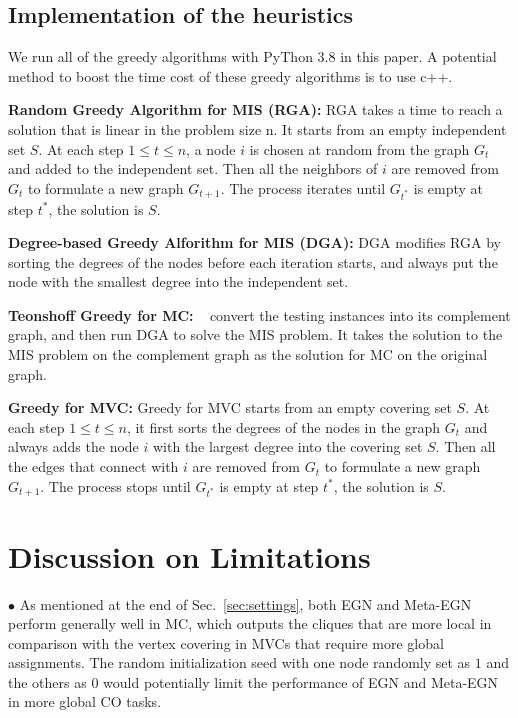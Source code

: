 \subsection{Implementation of the heuristics}
\label{sec:greedy_implementation}
We run all of the greedy algorithms with PyThon 3.8 in this paper. A potential method to boost the time cost of these greedy algorithms is to use c++.

\textbf{Random Greedy Algorithm for MIS (RGA):} RGA takes a time to reach a solution that is linear in the problem size n. It starts from an empty independent set $S$. At each step $1 \leq t \leq n$, a node $i$ is chosen at random from the graph $G_t$ and added to the independent set. Then all the neighbors of $i$ are removed from $G_t$ to formulate a new graph $G_{t+1}$. The process iterates until $G_{t^*}$ is empty at step $t^*$, the solution is $S$.

\textbf{Degree-based Greedy Alforithm for MIS (DGA):} DGA modifies RGA by sorting the degrees of the nodes before each iteration starts, and always put the node with the smallest degree into the independent set.

\textbf{Teonshoff Greedy for MC:} ~\cite{toenshoff2021graph} convert the testing instances into its complement graph, and then run DGA to solve the MIS problem. It takes the solution to the MIS problem on the complement graph as the solution for MC on the original graph.

\textbf{Greedy for MVC:} Greedy for MVC starts from an empty covering set $S$. At each step $1 \leq t \leq n$, it first sorts the degrees of the nodes in the graph $G_t$ and always adds the node $i$ with the largest degree into the covering set $S$. Then all the edges that connect with $i$ are removed from $G_t$ to formulate a new graph $G_{t+1}$. The process stops until $G_{t^*}$ is empty at step $t^*$, the solution is $S$.

\section{Discussion on Limitations}
$\bullet$ As mentioned at the end of Sec.~\ref{sec:settings}, both EGN and Meta-EGN perform generally well in MC, which outputs the cliques that are more local in comparison with the vertex covering in MVCs that require more global assignments. The random initialization seed with one node randomly set as $1$ and the others as $0$ would potentially limit the performance of EGN and Meta-EGN in more global CO tasks.

